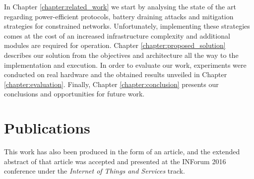 In Chapter \ref{chapter:related_work} we start by analysing the state of the art regarding power-efficient protocols, battery draining attacks and mitigation strategies for constrained networks. Unfortunately, implementing these strategies comes at the cost of an increased infrastructure complexity and additional modules are required for operation. Chapter \ref{chapter:proposed_solution} describes our solution from the objectives and architecture all the way to the implementation and execution. In order to evaluate our work, experiments were conducted on real hardware and the obtained results unveiled in Chapter \ref{chapter:evaluation}. Finally, Chapter \ref{chapter:conclusion} presents our conclusions and opportunities for future work. 

\section{Publications} 
	
This work has also been produced in the form of an article, and the extended abstract of that article was accepted and presented at the INForum 2016 conference under the \emph{Internet of Things and Services} track.
